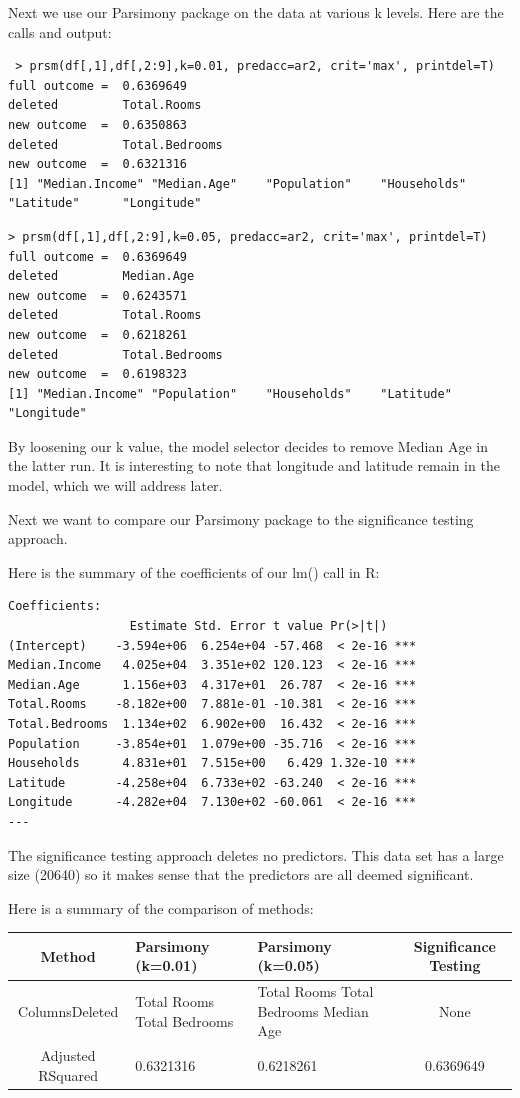 \documentclass[letter]{article}
\begin{document}
 
 Next we use our Parsimony package on the data at various k levels. Here are the calls and output:
\begin{verbatim}
 > prsm(df[,1],df[,2:9],k=0.01, predacc=ar2, crit='max', printdel=T)
full outcome =  0.6369649 
deleted         Total.Rooms 
new outcome  =  0.6350863 
deleted         Total.Bedrooms 
new outcome  =  0.6321316 
[1] "Median.Income" "Median.Age"    "Population"    "Households"    "Latitude"      "Longitude"
\end{verbatim}
\begin{verbatim}
> prsm(df[,1],df[,2:9],k=0.05, predacc=ar2, crit='max', printdel=T)
full outcome =  0.6369649 
deleted         Median.Age 
new outcome  =  0.6243571 
deleted         Total.Rooms 
new outcome  =  0.6218261 
deleted         Total.Bedrooms 
new outcome  =  0.6198323 
[1] "Median.Income" "Population"    "Households"    "Latitude"      "Longitude"
 \end{verbatim}
By loosening our k value, the model selector decides to remove Median Age in the latter run. It is interesting to note that longitude and latitude remain in the model, which we will address later.

Next we want to compare our Parsimony package to the significance testing approach. 

Here is the summary of the coefficients of our lm() call in R:
\begin{verbatim}
Coefficients:
                 Estimate Std. Error t value Pr(>|t|)    
(Intercept)    -3.594e+06  6.254e+04 -57.468  < 2e-16 ***
Median.Income   4.025e+04  3.351e+02 120.123  < 2e-16 ***
Median.Age      1.156e+03  4.317e+01  26.787  < 2e-16 ***
Total.Rooms    -8.182e+00  7.881e-01 -10.381  < 2e-16 ***
Total.Bedrooms  1.134e+02  6.902e+00  16.432  < 2e-16 ***
Population     -3.854e+01  1.079e+00 -35.716  < 2e-16 ***
Households      4.831e+01  7.515e+00   6.429 1.32e-10 ***
Latitude       -4.258e+04  6.733e+02 -63.240  < 2e-16 ***
Longitude      -4.282e+04  7.130e+02 -60.061  < 2e-16 ***
--- 
\end{verbatim}
The significance testing approach deletes no predictors. This data set has a large size (20640) so it makes sense that the predictors are all deemed significant.

Here is a summary of the comparison of methods:

\begin{tabular}{ | c | p{3cm} | p{3cm} | c  |}
\hline
Method&Parsimony (k=0.01) & Parsimony (k=0.05) & Significance Testing \\
\hline
Columns\newline Deleted& Total Rooms \newline Total Bedrooms & Total Rooms \newline Total Bedrooms \newline Median Age & None \\
\hline
Adjusted RSquared & 0.6321316 & 0.6218261 & 0.6369649 \\
\hline
\end{tabular}
\end{document}
